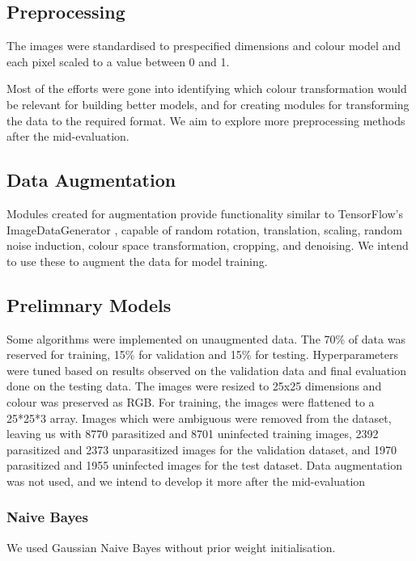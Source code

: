 \documentclass[10pt,twocolumn,letterpaper]{article}
\begin{document}
\subsection{Preprocessing}
The images were standardised to prespecified dimensions and colour model and each pixel scaled to a value between 0 and 1. 

Most of the efforts were gone into identifying which colour transformation would be relevant for building better models, and for creating modules for transforming the data to the required format. We aim to explore more preprocessing methods after the mid-evaluation.

\subsection{Data Augmentation}

Modules created for augmentation provide functionality similar to TensorFlow's ImageDataGenerator \cite{tensorflow_imagedatagen}, capable of random rotation, translation, scaling, random noise induction, colour space transformation, cropping, and denoising. We intend to use these to augment the data for model training.

\subsection{Prelimnary Models}

Some algorithms were implemented on unaugmented data. The 70\% of data was reserved for training, 15\% for validation and 15\% for testing. Hyperparameters were tuned based on results observed on the validation data and final evaluation done on the testing data. The images were resized to 25x25 dimensions and colour was preserved as RGB. For training, the images were flattened to a 25*25*3 array. Images which were ambiguous \cite{fuhadmalaria} were removed from the dataset, leaving us with 8770 parasitized and 8701 uninfected training images, 2392 parasitized and 2373 unparasitized images for the validation dataset, and 1970 parasitized and 1955 uninfected images for the test dataset. Data augmentation was not used, and we intend to develop it more after the mid-evaluation

\subsubsection{Naive Bayes}
We used Gaussian Naive Bayes without prior weight initialisation.
\end{document}
